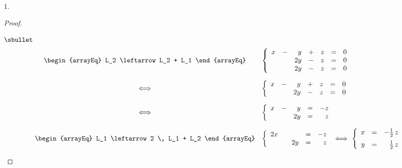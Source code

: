 \documentclass[11pt]{article}%
\begin{document}
\begin{noliste}{1.}
\begin{proof}
\begin{noliste}{$\sbullet$}
\[\begin{array}{rcl}
     &
     \begin{arrayEq}
      L_2 \leftarrow L_2 + L_1
     \end{arrayEq}
     &
     \left\{
     \begin{array}{rrrrrcl}
      x & - & y & + & z & = & 0\\
      & & 2y & - & z & = & 0\\
      & & 2y & - & z & = & 0
     \end{array}
     \right.
     \\[.8cm]
     & \Longleftrightarrow &
     \left\{
     \begin{array}{rrrrrcl}
      x & - & y & + & z & = & 0\\
      & & 2y & - & z & = & 0
     \end{array}
     \right.
     \\[.6cm]
     & \Longleftrightarrow & 
     \left\{
     \begin{array}{rrrcr}
      x & - & y & = & -z\\
      & & 2y & = & z
     \end{array}
     \right.
     \\[.6cm]
     &
     \begin{arrayEq}
      L_1 \leftarrow 2 \, L_1 + L_2
     \end{arrayEq}
     &
     \left\{
     \begin{array}{rrrcr}
      2x & & & = & -z\\
      & & 2y & = & z
     \end{array}
     \right.
     \ \Longleftrightarrow \
     \left\{
     \begin{array}{rcr}
       x & = & -\frac{1}{2} \, z\\[.2cm]
       y & = & \frac{1}{2} \, z
     \end{array}
     \right.
    \end{array}
   \]
   

   \newpage



\end{noliste}
\end{proof}
\end{noliste}
\end{document}

